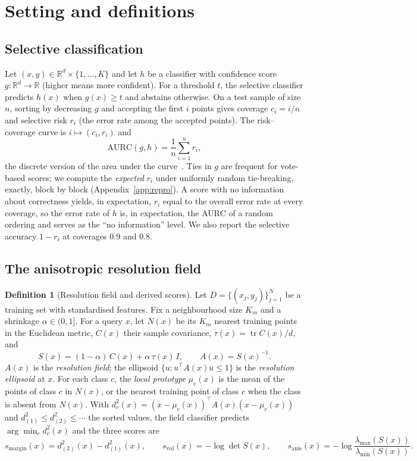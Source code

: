\documentclass[10pt,a4paper]{article}
\theoremstyle{plain}
\theoremstyle{definition}
\newtheorem{definition}[theorem]{Definition}
\theoremstyle{remark}
\newcommand{\R}{\mathbb{R}}
\newcommand{\aurc}{\mathrm{AURC}}
\newcommand{\dd}{d^2}
\begin{document}
\section{Setting and definitions}\label{sec:setting}

\subsection{Selective classification}

Let $(x,y)\in\R^d\times\{1,\dots,K\}$ and let $h$ be a classifier with confidence score $g:\R^d\to\R$ (higher means more confident). For a threshold $t$, the selective classifier predicts $h(x)$ when $g(x)\ge t$ and abstains otherwise. On a test sample of size $n$, sorting by decreasing $g$ and accepting the first $i$ points gives coverage $c_i=i/n$ and selective risk $r_i$ (the error rate among the accepted points). The risk--coverage curve is $i\mapsto (c_i,r_i)$ and
\[
\aurc(g,h)=\frac1n\sum_{i=1}^{n} r_i ,
\]
the discrete version of the area under the curve~\citep{geifman2019}. Ties in $g$ are frequent for vote-based scores; we compute the \emph{expected} $r_i$ under uniformly random tie-breaking, exactly, block by block (Appendix~\ref{app:repro}). A score with no information about correctness yields, in expectation, $r_i$ equal to the overall error rate at every coverage, so the error rate of $h$ is, in expectation, the AURC of a random ordering and serves as the ``no information'' level. We also report the selective accuracy $1-r_i$ at coverages $0.9$ and $0.8$.

\subsection{The anisotropic resolution field}

\begin{definition}[Resolution field and derived scores]\label{def:field}
Let $D=\{(x_j,y_j)\}_{j=1}^{N}$ be a training set with standardised features. Fix a neighbourhood size $K_m$ and a shrinkage $\alpha\in(0,1]$. For a query $x$, let $N(x)$ be its $K_m$ nearest training points in the Euclidean metric, $C(x)$ their sample covariance, $\tau(x)=\operatorname{tr}C(x)/d$, and
\[
S(x)=(1-\alpha)\,C(x)+\alpha\,\tau(x)\,I,\qquad A(x)=S(x)^{-1}.
\]
$A(x)$ is the \emph{resolution field}; the ellipsoid $\{u: u^{\top}A(x)u\le 1\}$ is the \emph{resolution ellipsoid} at $x$. For each class $c$, the \emph{local prototype} $\mu_c(x)$ is the mean of the points of class $c$ in $N(x)$, or the nearest training point of class $c$ when the class is absent from $N(x)$. With $\dd_c(x)=(x-\mu_c(x))^{\top}A(x)(x-\mu_c(x))$ and $\dd_{(1)}\le \dd_{(2)}\le\cdots$ the sorted values, the field classifier predicts $\arg\min_c \dd_c(x)$ and the three scores are
\[
s_{\mathrm{margin}}(x)=\dd_{(2)}(x)-\dd_{(1)}(x),\qquad
s_{\mathrm{vol}}(x)=-\log\det S(x),\qquad
s_{\mathrm{anis}}(x)=-\log\frac{\lambda_{\max}(S(x))}{\lambda_{\min}(S(x))}.
\]
\end{definition}
\end{document}
